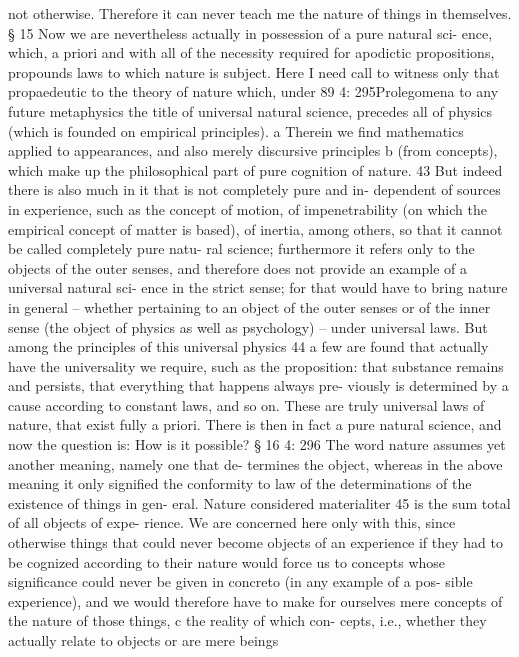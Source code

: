 not otherwise. Therefore it can never teach me the nature of things in
themselves.
§ 15
Now we are nevertheless actually in possession of a pure natural sci-
ence, which, a priori and with all of the necessity required for apodictic
propositions, propounds laws to which nature is subject. Here I need call
to witness only that propaedeutic to the theory of nature which, under
89
4: 295Prolegomena to any future metaphysics
the title of universal natural science, precedes all of physics (which is
founded on empirical principles). a Therein we ﬁnd mathematics applied
to appearances, and also merely discursive principles b (from concepts),
which make up the philosophical part of pure cognition of nature. 43
But indeed there is also much in it that is not completely pure and in-
dependent of sources in experience, such as the concept of motion, of
impenetrability (on which the empirical concept of matter is based), of
inertia, among others, so that it cannot be called completely pure natu-
ral science; furthermore it refers only to the objects of the outer senses,
and therefore does not provide an example of a universal natural sci-
ence in the strict sense; for that would have to bring nature in general –
whether pertaining to an object of the outer senses or of the inner sense
(the object of physics as well as psychology) – under universal laws. But
among the principles of this universal physics 44 a few are found that
actually have the universality we require, such as the proposition: that
substance remains and persists, that everything that happens always pre-
viously is determined by a cause according to constant laws, and so on.
These are truly universal laws of nature, that exist fully a priori. There
is then in fact a pure natural science, and now the question is: How is it
possible?
§ 16
4: 296
The word nature assumes yet another meaning, namely one that de-
termines the object, whereas in the above meaning it only signiﬁed the
conformity to law of the determinations of the existence of things in gen-
eral. Nature considered materialiter 45 is the sum total of all objects of expe-
rience. We are concerned here only with this, since otherwise things
that could never become objects of an experience if they had to be
cognized according to their nature would force us to concepts whose
signiﬁcance could never be given in concreto (in any example of a pos-
sible experience), and we would therefore have to make for ourselves
mere concepts of the nature of those things, c the reality of which con-
cepts, i.e., whether they actually relate to objects or are mere beings
